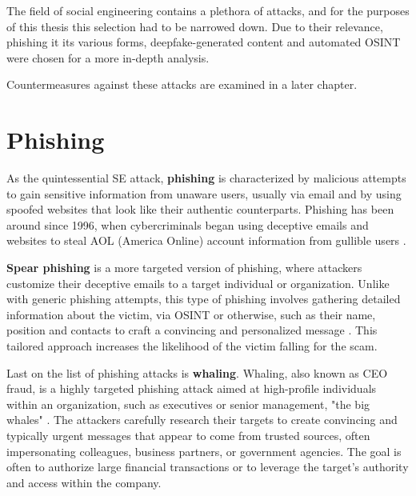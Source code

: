 The field of social engineering contains a plethora of attacks, and for the purposes of this thesis this selection had to be narrowed down. Due to their relevance, phishing it its various forms, deepfake-generated content and automated OSINT were chosen for a more in-depth analysis.

Countermeasures against these attacks are examined in a later chapter.










\section{Phishing}
\begin{comment}
    
    - 

\end{comment}


As the quintessential SE attack, \textbf{phishing} is characterized by malicious attempts to gain sensitive information from unaware users, usually via email and by using spoofed websites that look like their authentic counterparts. Phishing has been around since 1996, when cybercriminals began using deceptive emails and websites to steal AOL (America Online) account information from gullible users \citep{wang_defining_2020}.

\textbf{Spear phishing} is a more targeted version of phishing, where attackers customize their deceptive emails to a target individual or organization. Unlike with generic phishing attempts, this type of phishing involves gathering detailed information about the victim, via OSINT or otherwise, such as their name, position and contacts to craft a convincing and personalized message \citep{salahdine_social_2019}. This tailored approach increases the likelihood of the victim falling for the scam.

Last on the list of phishing attacks is \textbf{whaling}. Whaling, also known as CEO fraud, is a highly targeted phishing attack aimed at high-profile individuals within an organization, such as executives or senior management, "the big whales" \citep{abraham_overview_2010}. The attackers carefully research their targets to create convincing and typically urgent messages that appear to come from trusted sources, often impersonating colleagues, business partners, or government agencies. The goal is often to authorize large financial transactions or to leverage the target's authority and access within the company.

